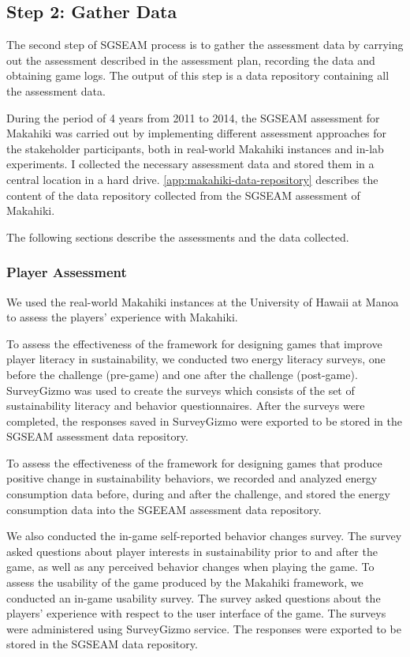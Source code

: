\subsection{Step 2: Gather Data}

The second step of SGSEAM process is to gather the assessment data by carrying out the assessment described in the assessment plan, recording the data and obtaining game logs. The output of this step is a data repository containing all the assessment data. 

During the period of 4 years from 2011 to 2014, the SGSEAM assessment for Makahiki was carried out by implementing different assessment approaches for the stakeholder participants, both in real-world Makahiki instances and in-lab experiments. I collected the necessary assessment data and stored them in a central location in a hard drive. \autoref{app:makahiki-data-repository} describes the content of the data repository collected from the SGSEAM assessment of Makahiki. 

The following sections describe the assessments and the data collected. 

\subsubsection{Player Assessment}

We used the real-world Makahiki instances at the University of Hawaii at Manoa to assess the players' experience with Makahiki. 

To assess the effectiveness of the framework for designing games that improve player literacy in sustainability, we
conducted two energy literacy surveys, one before the challenge (pre-game) and one after
the challenge (post-game). SurveyGizmo was used to create the surveys which consists of the set of sustainability literacy and behavior questionnaires. 
After the surveys were completed, the responses saved in SurveyGizmo were exported to be stored in the SGSEAM assessment data repository.

To assess the effectiveness of the framework for designing games that produce positive change in sustainability
behaviors, we recorded and analyzed energy consumption data before, during and after the
challenge, and stored the energy consumption data into the SGEEAM assessment data repository. 

We also conducted the in-game self-reported behavior changes survey. The survey asked questions about player interests in sustainability prior to and after the game, as well as any perceived behavior changes when playing the game.  To assess the usability of the game produced by the Makahiki framework, we conducted an in-game usability survey. The survey asked questions about the players' experience with respect to the user interface of the game. The surveys were administered using SurveyGizmo service. The responses were exported to be stored in the SGSEAM data repository.

